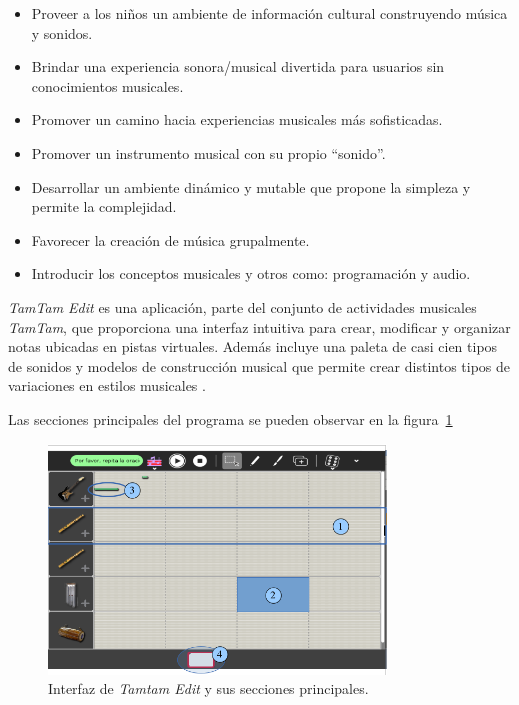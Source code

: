\begin{itemize}
    \item Proveer a los ni\~nos un ambiente de informaci\'on cultural construyendo m\'usica y sonidos.
    \item Brindar una experiencia sonora/musical divertida para usuarios sin conocimientos musicales.
    \item Promover un camino hacia experiencias musicales m\'as sofisticadas.
    \item Promover un instrumento musical con su propio ``sonido''.
    \item Desarrollar un ambiente din\'amico y mutable que propone la simpleza y permite la complejidad.
    \item Favorecer la creaci\'on de m\'usica grupalmente.
    \item Introducir los conceptos musicales y otros como: programaci\'on y audio.
\end{itemize}

\emph{TamTam Edit} es una aplicaci\'on, parte del conjunto de actividades musicales 
\emph{TamTam}, que proporciona una interfaz intuitiva para crear, modificar y organizar notas ubicadas 
en pistas virtuales.
Adem\'as incluye una paleta de casi cien tipos de sonidos y modelos de construcci\'on musical que permite 
crear distintos tipos de variaciones en estilos musicales \cite{TamTamWiki}.


Las secciones principales del programa se pueden observar en la figura~\ref{figure:ui-tamtam} 

\begin{figure}[H]
\centering
\includegraphics[width=0.8\textwidth]{./graphics/ui-tamtam-edit.png}
\caption{Interfaz de \emph{Tamtam Edit} y sus secciones principales.}
\label{figure:ui-tamtam}
\end{figure}

